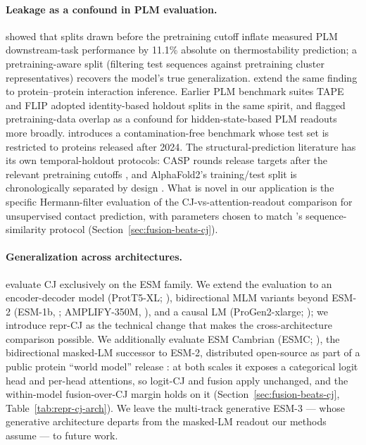 \documentclass{article}
\begin{document}
\paragraph{Leakage as a confound in PLM evaluation.}
\citet{hermann2024leakage} showed that splits drawn before the
pretraining cutoff inflate measured PLM downstream-task performance
by 11.1\% absolute on thermostability prediction; a pretraining-aware
split (filtering test sequences against pretraining cluster
representatives) recovers the model's true generalization.
\citet{bartoszewicz2025ppileakage} extend the same finding to
protein--protein interaction inference. Earlier PLM benchmark suites
TAPE \citep{rao2019tape} and FLIP \citep{dallago2021flip} adopted
identity-based holdout splits in the same spirit, and
\citet{detlefsen2022plmrepr} flagged pretraining-data overlap as a
confound for hidden-state-based PLM readouts more broadly.
\citet{liveproteinbench2025} introduces a contamination-free
benchmark whose test set is restricted to proteins released after 2024. The structural-prediction literature has
its own temporal-holdout protocols: CASP rounds release targets after
the relevant pretraining cutoffs \citep{kryshtafovych2021casp14}, and
AlphaFold2's training/test split is chronologically separated by
design \citep{jumper2021af2}. What is novel in our application is the
specific Hermann-filter evaluation of the CJ-vs-attention-readout
comparison for unsupervised contact prediction, with parameters chosen
to match \citeauthor{hermann2024leakage}'s sequence-similarity
protocol (Section~\ref{sec:fusion-beats-cj}).

\paragraph{Generalization across architectures.}
\citet{zhang2024cj} evaluate CJ exclusively on the ESM family. We
extend the evaluation to an encoder-decoder model (ProtT5-XL;
\citealp{elnaggar2021prottrans}), bidirectional MLM variants beyond
ESM-2 (ESM-1b, \citealp{rives2021esm1b}; AMPLIFY-350M,
\citealp{fournier2024amplify}), and a causal LM (ProGen2-xlarge;
\citealp{madani2023progen2}); we introduce repr-CJ as the
technical change that makes the cross-architecture comparison
possible. We additionally evaluate ESM Cambrian (ESMC;
\citealp{esmteam2024esmc}), the bidirectional masked-LM successor to
ESM-2, distributed open-source as part of a public protein
``world model'' release \citep{biohub2026esm}: at both scales it
exposes a categorical logit head and per-head attentions, so logit-CJ
and fusion apply unchanged, and the within-model fusion-over-CJ margin
holds on it (Section~\ref{sec:fusion-beats-cj},
Table~\ref{tab:repr-cj-arch}). We leave the multi-track generative ESM-3
\citep{hayes2025esm3} --- whose generative architecture departs from
the masked-LM readout our methods assume --- to future work.
\end{document}
